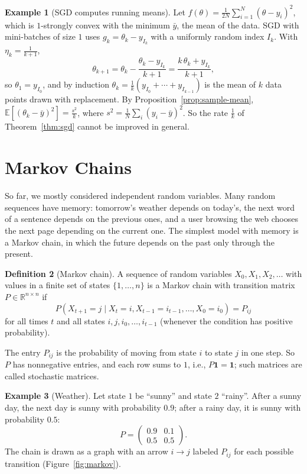 \documentclass[11pt]{article}
\newcommand{\E}{\mathbb{E}}
\theoremstyle{definition}
\newtheorem{definition}{Definition}[section]
\newtheorem{example}[definition]{Example}
\theoremstyle{plain}
\theoremstyle{remark}
\begin{document}
\begin{example}[SGD computes running means]\label{ex:sgd-mean}
    Let $f(\theta) = \frac{1}{2N}\sum_{i=1}^N (\theta - y_i)^2$, which is $1$-strongly convex with the minimum $\bar y$, the mean of the data. SGD with mini-batches of size $1$ uses $g_k = \theta_k - y_{I_k}$ with a uniformly random index $I_k$. With $\eta_k = \frac{1}{k + 1}$,
    \[\theta_{k+1} = \theta_k - \frac{\theta_k - y_{I_k}}{k + 1} = \frac{k\,\theta_k + y_{I_k}}{k + 1},\]
    so $\theta_1 = y_{I_0}$, and by induction $\theta_k = \frac{1}{k}(y_{I_0} + \cdots + y_{I_{k-1}})$ is the mean of $k$ data points drawn with replacement. By Proposition~\ref{prop:sample-mean}, $\E[(\theta_k - \bar y)^2] = \frac{s^2}{k}$, where $s^2 = \frac{1}{N}\sum_i (y_i - \bar y)^2$. So the rate $\frac{1}{k}$ of Theorem~\ref{thm:sgd} cannot be improved in general.
\end{example}

\section{Markov Chains}\label{sec:markov}

So far, we mostly considered independent random variables. Many random sequences have memory: tomorrow's weather depends on today's, the next word of a sentence depends on the previous ones, and a user browsing the web chooses the next page depending on the current one. The simplest model with memory is a Markov chain, in which the future depends on the past only through the present.

\begin{definition}[Markov chain]\label{def:markov}
    A sequence of random variables $X_0, X_1, X_2, \ldots$ with values in a finite set of states $\{1, \ldots, n\}$ is a Markov chain with transition matrix $P \in \mathbb{R}^{n \times n}$ if
    \[P(X_{t+1} = j \mid X_t = i, X_{t-1} = i_{t-1}, \ldots, X_0 = i_0) = P_{ij}\]
    for all times $t$ and all states $i, j, i_0, \ldots, i_{t-1}$ (whenever the condition has positive probability).
\end{definition}

The entry $P_{ij}$ is the probability of moving from state $i$ to state $j$ in one step. So $P$ has nonnegative entries, and each row sums to $1$, i.e., $P\mathbf{1} = \mathbf{1}$; such matrices are called stochastic matrices.

\begin{example}[Weather]\label{ex:weather}
    Let state $1$ be ``sunny'' and state $2$ ``rainy''. After a sunny day, the next day is sunny with probability $0.9$; after a rainy day, it is sunny with probability $0.5$:
    \[P = \begin{pmatrix} 0.9 & 0.1 \\ 0.5 & 0.5 \end{pmatrix}.\]
    The chain is drawn as a graph with an arrow $i \to j$ labeled $P_{ij}$ for each possible transition (Figure~\ref{fig:markov}).
\end{example}
\end{document}
